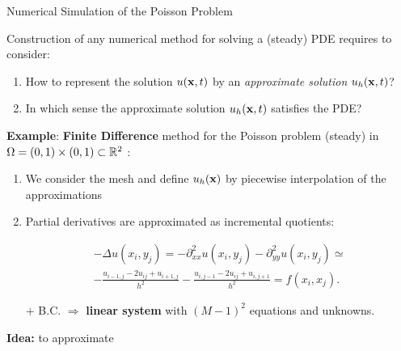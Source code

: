 \begin{frame}{Numerical Simulation of the Poisson Problem}

\small
Construction of any numerical method for solving a (steady) PDE requires to consider:
\begin{enumerate}
\item How to represent the solution $u(\mathbf{x},t)$ by an
  \textit{approximate solution} $u_h(\mathbf{x},t)$?
\item In which sense the approximate solution $u_h (\mathbf{x},t)$
  satisfies the PDE?
\end{enumerate}

\bigskip

\textbf{Example}: \alert{\textbf{Finite Difference}} method for the \alert{Poisson
problem} (steady) in $\Omega=(0,1)\times (0,1) \subset{\mathbb R}^2$ :

\begin{enumerate}
\item We consider the mesh 
and define $u_h(\mathbf{x})$ by piecewise interpolation of the approximations 
\item Partial derivatives are approximated  as incremental quotients:
  \begin{BlockNoTitle}
    \vspace{-1.5em}
    \begin{multline*}
      -\Delta u(x_i,y_j) = -\partial^2_{xx}u(x_i,y_j)
      -\partial^2_{yy}u(x_i,y_j)\simeq
      \\
      -\frac{u_{i-1,j}-2u_{ij}+u_{i+1,j}}{h^2}
      -\frac{u_{i,j-1}-2u_{ij}+u_{i,j+1}}{h^2} = f(x_i,x_j).
    \end{multline*}
  \end{BlockNoTitle}
  + B.C. $\Rightarrow$ \textbf{linear system} with $(M-1)^2$ equations and unknowns.
\end{enumerate}

\end{frame}

\begin{frame}
  \textbf{Idea:} to approximate
\end{frame}

